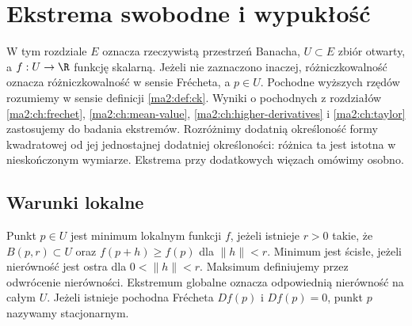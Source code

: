 \chapter{Ekstrema swobodne i wypukłość}
\label{ma2:ch:free-extrema-convexity}

W tym rozdziale $E$ oznacza rzeczywistą przestrzeń Banacha,
$U\subset E$ zbiór otwarty, a $f:U\to\R$ funkcję skalarną.
Jeżeli nie zaznaczono inaczej, różniczkowalność oznacza
różniczkowalność w sensie Frécheta, a $p\in U$.
Pochodne wyższych rzędów rozumiemy w sensie
definicji \ref{ma2:def:ck}.
Wyniki o pochodnych z rozdziałów
\ref{ma2:ch:frechet}, \ref{ma2:ch:mean-value},
\ref{ma2:ch:higher-derivatives} i \ref{ma2:ch:taylor}
zastosujemy do badania ekstremów. Rozróżnimy dodatnią określoność formy
kwadratowej od jej jednostajnej dodatniej określoności:
różnica ta jest istotna w nieskończonym wymiarze.
Ekstrema przy dodatkowych więzach omówimy osobno.

\section{Warunki lokalne}

\begin{definicja}
\label{ma2:def:free-extrema}
Punkt $p\in U$ jest minimum lokalnym funkcji $f$, jeżeli
istnieje $r>0$ takie, że $B(p,r)\subset U$ oraz
$f(p+h)\ge f(p)$ dla $\|h\|<r$. Minimum jest ścisłe,
jeżeli nierówność jest ostra dla $0<\|h\|<r$.
Maksimum definiujemy przez odwrócenie nierówności.
Ekstremum globalne oznacza odpowiednią nierówność na całym $U$.
Jeżeli istnieje pochodna Frécheta $Df(p)$ i $Df(p)=0$,
punkt $p$ nazywamy stacjonarnym.
\end{definicja}

